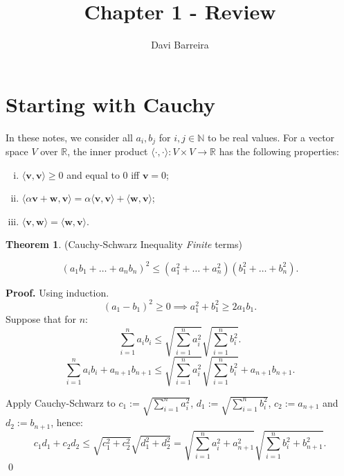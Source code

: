 \documentclass[11pt]{article}
\title{Chapter 1 - Review}
\author{Davi Barreira}
\theoremstyle{definition}
\newenvironment{prf}[1][Proof]{\textbf{#1.} }{\qed}
\newtheorem{theorem}{Theorem}[section]
\begin{document}
\maketitle
\thispagestyle{fancy}
\setcounter{section}{0}
\section{Starting with Cauchy}

In these notes, we consider all
$a_i, b_j$ for $i,j \in \mathbb N$ to be real values.
For a vector space $V$ over $\mathbb R$, the inner product
$\langle \cdot, \cdot \rangle: V \times V \to \mathbb R$ has the following
properties:
\begin{enumerate}[(i)]
    \item $\langle \mathbf v, \mathbf v \rangle \geq 0$ and equal to $0$ iff $\mathbf v = 0$;
    \item $\langle \alpha \mathbf v + \mathbf w, \mathbf v \rangle
    = \alpha \langle \mathbf v, \mathbf v \rangle + \langle \mathbf w, \mathbf v \rangle$;
    \item $\langle \mathbf v, \mathbf w \rangle = \langle \mathbf w, \mathbf v \rangle$.
\end{enumerate}

\begin{theorem}{(Cauchy-Schwarz Inequality \textit{Finite} terms)}
    
   \begin{equation}
    (a_1 b_1 + \dots + a_n b_n)^2 \leq
    (a_1^2 +  \dots + a_n^2)(b_1^2  + \dots + b_n^2).
   \end{equation}
\end{theorem}
\begin{shaded}
\begin{prf}
    Using induction.
    \begin{equation*}
        (a_1 - b_1)^2 \geq 0 \implies a_1^2 + b_1^2 \geq 2 a_1 b_1.
    \end{equation*}
    Suppose that for $n$:
    \begin{equation*}
        \sum^n_{i=1} a_i b_i \leq
        \sqrt{\sum^n_{i=1}a_i^2}
        \sqrt{\sum^n_{i=1}b_i^2}.
    \end{equation*}
    \begin{equation*}
        \sum^n_{i=1} a_i b_i
        + a_{n+1} b_{n+1}
        \leq
        \sqrt{\sum^n_{i=1}a_i^2}
        \sqrt{\sum^n_{i=1}b_i^2}
        + a_{n+1} b_{n+1}.
    \end{equation*}

    Apply Cauchy-Schwarz to $c_1 := \sqrt{\sum^n_{i=1}a_i^2}$, $d_1 := \sqrt{\sum^n_{i=1}b_i^2}$,
    $c_2 := a_{n+1}$ and $d_2 := b_{n+1}$, hence:
    \begin{equation*}
        c_1 d_1 + c_2 d_2 \leq
        \sqrt{c_1 ^2 + c_2^2}
        \sqrt{d_1 ^2 + d_2^2} =
        \sqrt{\sum^n_{i=1}a_i^2 + a_{n+1}^2}
        \sqrt{\sum^n_{i=1}b_i^2 + b_{n+1}^2}.
    \end{equation*}
\end{prf}
\end{shaded}
\end{document}
